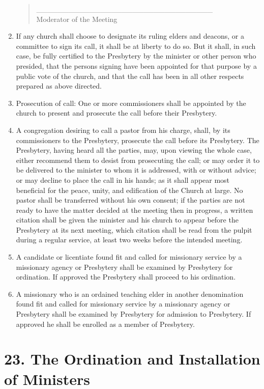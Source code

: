 \documentclass[
]{book}
\begin{document}
\begin{enumerate}
\begin{quote}
  \_\_\_\_\_\_\_\_\_\_\_\_\_\_\_\_\_\_\_\_\_\_\_\_\_\_\_\_\_\_\_\_\_\\
  Moderator of the Meeting
  \end{quote}
\item
  If any church shall choose to designate its ruling elders and deacons, or a committee to sign its call, it shall be at liberty to do so. But it shall, in such case, be fully certified to the Presbytery by the minister or other person who presided, that the persons signing have been appointed for that purpose by a public vote of the church, and that the call has been in all other respects prepared as above directed.
\item
  Prosecution of call: One or more commissioners shall be appointed by the church to present and prosecute the call before their Presbytery.
\item
  A congregation desiring to call a pastor from his charge, shall, by its commissioners to the Presbytery, prosecute the call before its Presbytery. The Presbytery, having heard all the parties, may, upon viewing the whole case, either recommend them to desist from prosecuting the call; or may order it to be delivered to the minister to whom it is addressed, with or without advice; or may decline to place the call in his hands; as it shall appear most beneficial for the peace, unity, and edification of the Church at large. No pastor shall be transferred without his own consent; if the parties are not ready to have the matter decided at the meeting then in progress, a written citation shall be given the minister and his church to appear before the Presbytery at its next meeting, which citation shall be read from the pulpit during a regular service, at least two weeks before the intended meeting.
\item
  A candidate or licentiate found fit and called for missionary service by a missionary agency or Presbytery shall be examined by Presbytery for ordination. If approved the Presbytery shall proceed to his ordination.
\item
  A missionary who is an ordained teaching elder in another denomination found fit and called for missionary service by a missionary agency or Presbytery shall be examined by Presbytery for admission to Presbytery. If approved he shall be enrolled as a member of Presbytery.
\end{enumerate}

\hypertarget{the-ordination-and-installation-of-ministers}{%
\section*{23. The Ordination and Installation of Ministers}\label{the-ordination-and-installation-of-ministers}}
\end{document}
